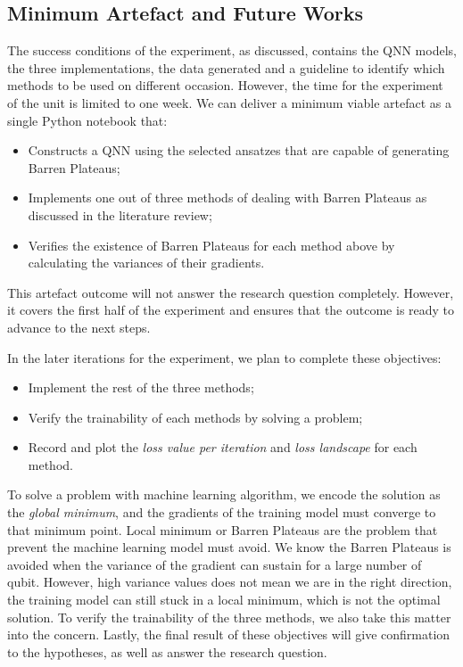 \subsection{Minimum Artefact and Future Works}
\label{Minimum Artefacts}

The success conditions of the experiment, as discussed, contains the QNN models, the three implementations, the data generated and a guideline to identify which methods to be used on different occasion.
However, the time for the experiment of the unit is limited to one week. We can deliver a minimum viable artefact as a single Python notebook that:
\begin{itemize}
    \item Constructs a QNN using the selected ansatzes that are capable of generating Barren Plateaus;
    \item Implements one out of three methods of dealing with Barren Plateaus as discussed in the literature review;
    \item Verifies the existence of Barren Plateaus for each method above by calculating the variances of their gradients.
\end{itemize}

This artefact outcome will not answer the research question completely.
However, it covers the first half of the experiment and ensures that the outcome is ready to advance to the next steps.

In the later iterations for the experiment, we plan to complete these objectives:
\begin{itemize}
    \item Implement the rest of the three methods;
    \item Verify the trainability of each methods by solving a problem;
    \item Record and plot the \textit{loss value per iteration} and \textit{loss landscape} for each method.
\end{itemize}

To solve a problem with machine learning algorithm, we encode the solution as the \textit{global minimum}, and the gradients of the training model must converge to that minimum point.
Local minimum or Barren Plateaus are the problem that prevent the machine learning model must avoid.
We know the Barren Plateaus is avoided when the variance of the gradient can sustain for a large number of qubit.
However, high variance values does not mean we are in the right direction, the training model can still stuck in a local minimum, which is not the optimal solution.
To verify the trainability of the three methods, we also take this matter into the concern.
Lastly, the final result of these objectives will give confirmation to the hypotheses, as well as answer the research question.
